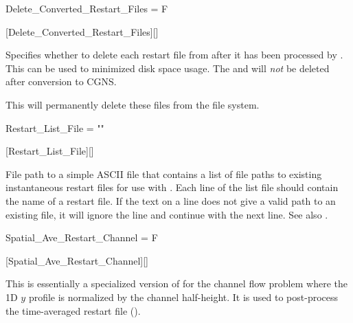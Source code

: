 
\begin{nmldescitem}
Delete_Converted_Restart_Files = F
\end{nmldescitem}
[Delete\_Converted\_Restart\_Files][]

\begin{nmldescbody}
Specifies whether to delete each restart file from
after it has been processed by
.
%
This can be used to minimized disk space usage.
%
The
 and
will \emph{not} be deleted after conversion to CGNS.

\noindent{} This will permanently delete
these files from the file system.
\end{nmldescbody}



\begin{nmldescitem}
Restart_List_File = ""
\end{nmldescitem}
[Restart\_List\_File][]

\begin{nmldescbody}
File path to a simple ASCII file that contains a list of file paths to
existing instantaneous restart files for use with
.
%
Each line of the list file should contain the name of a restart file.
%
If the text on a line does not give a valid path to an existing file, it will
ignore the line and continue with the next line.
%
See also
.
\end{nmldescbody}


\begin{nmldescitem}
Spatial_Ave_Restart_Channel = F
\end{nmldescitem}
[Spatial\_Ave\_Restart\_Channel][]

\begin{nmldescbody}
This is essentially a specialized version of
for the channel flow problem
where the 1D $y$ profile is normalized by the channel half-height.
%
It is used to post-process the time-averaged restart file
().
\end{nmldescbody}

